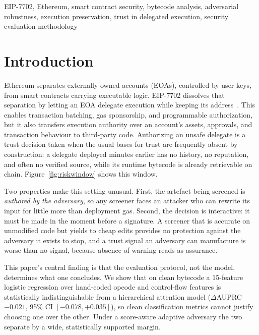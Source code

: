 \documentclass[conference]{IEEEtran}
\begin{document}
\begin{IEEEkeywords}
EIP-7702, Ethereum, smart contract security, bytecode analysis, adversarial robustness, execution preservation, trust in delegated execution, security evaluation methodology
\end{IEEEkeywords}

\section{Introduction}
\label{sec:intro}

Ethereum separates externally owned accounts (EOAs), controlled by user keys, from smart contracts carrying executable logic. EIP-7702 dissolves that separation by letting an EOA delegate execution while keeping its address~\cite{eip7702}. This enables transaction batching, gas sponsorship, and programmable authorization, but it also transfers execution authority over an account's assets, approvals, and transaction behaviour to third-party code. Authorizing an unsafe delegate is a trust decision taken when the usual bases for trust are frequently absent by construction: a delegate deployed minutes earlier has no history, no reputation, and often no verified source, while its runtime bytecode is already retrievable on chain. Figure~\ref{fig:riskwindow} shows this window.

Two properties make this setting unusual. First, the artefact being screened is \emph{authored by the adversary}, so any screener faces an attacker who can rewrite its input for little more than deployment gas. Second, the decision is interactive: it must be made in the moment before a signature. A screener that is accurate on unmodified code but yields to cheap edits provides no protection against the adversary it exists to stop, and a trust signal an adversary can manufacture is worse than no signal, because absence of warning reads as assurance.

This paper's central finding is that the evaluation protocol, not the model, determines what one concludes. We show that on clean bytecode a 15-feature logistic regression over hand-coded opcode and control-flow features is statistically indistinguishable from a hierarchical attention model ($\Delta$AUPRC $-0.021$, 95\% CI $[-0.078,+0.035]$), so clean classification metrics cannot justify choosing one over the other. Under a score-aware adaptive adversary the two separate by a wide, statistically supported margin.
\end{document}
